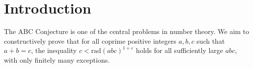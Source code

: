 
\section{Introduction}
The ABC Conjecture is one of the central problems in number theory.
We aim to constructively prove that for all coprime positive integers \( a, b, c \) such that \( a + b = c \),
the inequality \( c < \mathrm{rad}(abc)^{1+\varepsilon} \) holds for all sufficiently large \( abc \),
with only finitely many exceptions.

